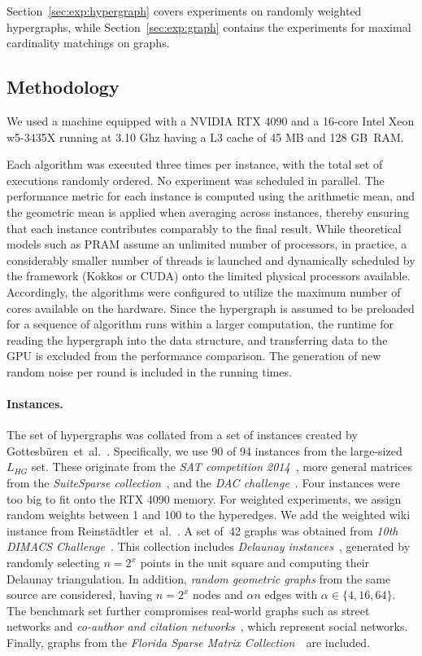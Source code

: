 \documentclass[runningheads]{llncs}
\begin{document}
Section~\ref{sec:exp:hypergraph} covers  experiments on randomly weighted hypergraphs, while Section~\ref{sec:exp:graph} contains the experiments for maximal cardinality matchings on graphs.

\subsection{Methodology}
We used a machine equipped with a NVIDIA RTX 4090 and  a 16-core Intel Xeon w5-3435X running at 3.10 Ghz having a L3 cache of 45 MB and 128 GB~RAM.

Each algorithm was executed three times per instance, with the total set of executions randomly ordered. 
No experiment was scheduled in parallel.
The performance metric for each instance is computed using the arithmetic mean, and the geometric mean is applied when averaging across instances, thereby ensuring that each instance contributes comparably to the ﬁnal result. While theoretical models such as PRAM assume an unlimited number of processors, in practice, a considerably smaller number of threads is launched and dynamically scheduled by the framework (Kokkos or CUDA) onto the limited physical processors available. Accordingly, the algorithms were configured to utilize the maximum number of cores available on the hardware. Since the hypergraph is assumed to be preloaded for a sequence of algorithm runs within a larger computation, the runtime for reading the hypergraph into the data structure, and transferring data to the GPU is excluded from the performance comparison. 
The generation of new random noise per round is included in the running times.



\paragraph{Instances.}
The set of hypergraphs was collated from a set of instances created by Gottesbüren~et~al.~\cite{gottesburen2023}. Specifically, we use 90 of 94 instances from the large-sized \textsf{$L_{HG}$} set. These originate from the \emph{SAT competition 2014}~\cite{sat2014}, more general matrices from the \emph{SuiteSparse collection}~\cite{davis2011}, and the \emph{DAC challenge}~\cite{viswanathan2012}. Four instances were too big to fit onto the RTX 4090 memory.
For weighted experiments, we assign random weights between 1 and 100 to the hyperedges.
We add the weighted wiki instance from Reinstädtler~et~al.~\cite{reinstadtler2025wiki}.
A set of~42 graphs was obtained from \emph{10th DIMACS Challenge}~\cite{DBLP:conf/dimacs/2012}.
This collection includes \emph{Delaunay instances}~\cite{DBLP:conf/ipps/HoltgreweSS10}, generated by randomly selecting $n = 2^{x}$ points in the unit square and computing their Delaunay triangulation. In addition, \emph{random geometric graphs} from the same source are considered, having $n = 2^{x}$ nodes and $\alpha n$ edges with $\alpha \in \{4, 16, 64\}$. The benchmark set further compromises real-world graphs such as street networks and \emph{co-author and citation networks}~\cite{DBLP:conf/alenex/GeisbergerSS08}, which represent social networks. Finally, graphs from the \emph{Florida Sparse Matrix Collection}~\cite{davis2011}~are included.
\end{document}
